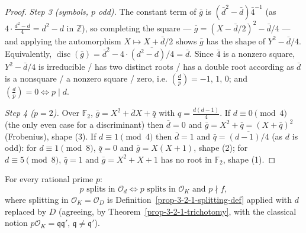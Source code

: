 \begin{proof}
  \emph{Step 3 (symbols, $p$ odd).} The constant term of $\bar g$ is
  $(\bar d^2 - \bar d)\bar 4^{-1}$ (as $4 \cdot \tfrac{d^2-d}{4} = d^2 - d$
  in $\mathbb{Z}$), so completing the square —
  $\bar g = (X - \bar d/2)^2 - \bar d/4$ — and applying the automorphism
  $X \mapsto X + \bar d/2$ shows $\bar g$ has the shape of $Y^2 - \bar d/4$.
  Equivalently, $\operatorname{disc}(\bar g) = \bar d^2 - 4 \cdot
  \overline{(d^2 - d)/4} = \bar d$. Since $\bar 4$ is a nonzero square,
  $Y^2 - \bar d/4$ is irreducible / has two distinct roots / has a double
  root according as $\bar d$ is a nonsquare / a nonzero square / zero, i.e.
  $\left(\frac dp\right) = -1$, $1$, $0$; and $\left(\frac dp\right) = 0
  \iff p \mid d$.

  \emph{Step 4 ($p = 2$).} Over $\mathbb{F}_2$, $\bar g = X^2 + \bar d X +
  \bar q$ with $q = \tfrac{d(d-1)}{4}$. If $d \equiv 0 \pmod 4$ (the only
  even case for a discriminant) then $\bar d = 0$ and $\bar g = X^2 + \bar q
  = (X + \bar q)^2$ (Frobenius), shape (3). If $d \equiv 1 \pmod 4$ then
  $\bar d = 1$ and $\bar q = \overline{(d-1)/4}$ (as $d$ is odd): for
  $d \equiv 1 \pmod 8$, $\bar q = 0$ and $\bar g = X(X + 1)$, shape (2); for
  $d \equiv 5 \pmod 8$, $\bar q = 1$ and $\bar g = X^2 + X + 1$ has no root
  in $\mathbb{F}_2$, shape (1).
\end{proof}

\begin{lemma}
  \label{prop-3-2-1-split-criterion}
  For every rational prime $p$:
  \[
    p \text{ splits in } \mathcal{O}_d
    \iff
    p \text{ splits in } \mathcal{O}_K \text{ and } p \nmid f,
  \]
  where splitting in $\mathcal{O}_K = \mathcal{O}_D$ is
  Definition~\ref{prop-3-2-1-splitting-def} applied with $d$ replaced by
  $D$ (agreeing, by Theorem~\ref{prop-3-2-1-trichotomy}, with the classical
  notion $p\mathcal{O}_K = \mathfrak{q}\mathfrak{q}'$, $\mathfrak{q} \neq
  \mathfrak{q}'$).
\end{lemma}

